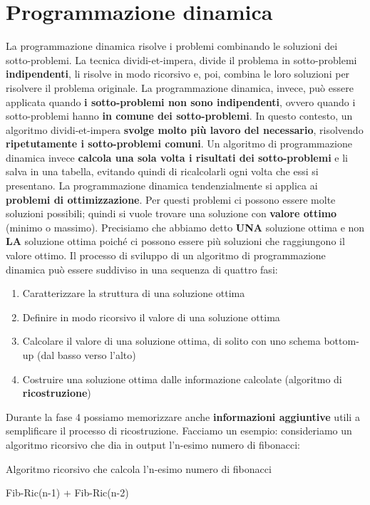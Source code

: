\documentclass[12pt]{article}
\begin{document}
\section{Programmazione dinamica}
La programmazione dinamica risolve i problemi combinando le soluzioni dei sotto-problemi.
La tecnica dividi-et-impera, divide il problema in sotto-problemi \textbf{indipendenti}, li risolve in modo ricorsivo e, poi, combina
le loro soluzioni per risolvere il problema originale. La programmazione dinamica, invece, può essere applicata quando \textbf{i sotto-problemi non sono indipendenti},
ovvero quando i sotto-problemi hanno \textbf{in comune dei sotto-problemi}. In questo contesto, un algoritmo dividi-et-impera \textbf{svolge molto più lavoro del necessario},
risolvendo \textbf{ripetutamente i sotto-problemi comuni}. Un algoritmo di programmazione dinamica invece \textbf{calcola una sola volta i risultati dei sotto-problemi} e li
salva in una tabella, evitando quindi di ricalcolarli ogni volta che essi si presentano. La programmazione dinamica tendenzialmente si applica ai \textbf{problemi di ottimizzazione}.
Per questi problemi ci possono essere molte soluzioni possibili; quindi si vuole trovare una soluzione con \textbf{valore ottimo} (minimo o massimo). Precisiamo che abbiamo detto \textbf{UNA} soluzione
ottima e non \textbf{LA} soluzione ottima poiché ci possono essere più soluzioni che raggiungono il valore ottimo.
Il processo di sviluppo di un algoritmo di programmazione dinamica può essere suddiviso in una sequenza di quattro fasi:
\begin{enumerate}
    \item Caratterizzare la struttura di una soluzione ottima
    \item Definire in modo ricorsivo il valore di una soluzione ottima
    \item Calcolare il valore di una soluzione ottima, di solito con uno schema bottom-up (dal basso verso l'alto)
    \item Costruire una soluzione ottima dalle informazione calcolate (algoritmo di \textbf{ricostruzione})
\end{enumerate}
Durante la fase 4 possiamo memorizzare anche \textbf{informazioni aggiuntive} utili a semplificare il processo di ricostruzione.
Facciamo un esempio: consideriamo un algoritmo ricorsivo che dia in output l'n-esimo numero di fibonacci: \newline
\begin{algorithm}[H]
\caption{Algoritmo ricorsivo che calcola l'n-esimo numero di fibonacci}
\DontPrintSemicolon
{}
 {
     {
    } {
        \Return Fib-Ric(n-1) + Fib-Ric(n-2)
    }
}
\end{algorithm}
\end{document}
